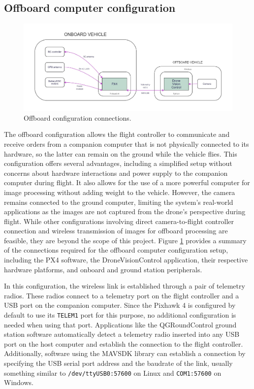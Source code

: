 \subsection{Offboard computer configuration}
\label{subsec:offboard}

\begin{figure}
  \centering
  \includegraphics[width=\textwidth,keepaspectratio]{img/offboard-diagram.jpg}
  \caption{Offboard configuration connections.}
  \label{fig:offboard-config}
\end{figure}

The offboard configuration allows the flight controller to communicate and receive orders from a companion computer that is not physically connected to its hardware, so the latter can remain on the ground while the vehicle flies.
This configuration offers several advantages, including a simplified setup without concerns about hardware interactions and power supply to the companion computer during flight. It also allows for the use of a more powerful computer for image processing without adding weight to the vehicle. However, the camera remains connected to the ground computer, limiting the system's real-world applications as the images are not captured from the drone's perspective during flight. While other configurations involving direct camera-to-flight controller connection and wireless transmission of images for offboard processing are feasible, they are beyond the scope of this project. Figure \ref{fig:offboard-config} provides a summary of the connections required for the offboard computer configuration setup, including the PX4 software, the DroneVisionControl application, their respective hardware platforms, and onboard and ground station peripherals.

In this configuration, the wireless link is established through a pair of telemetry radios.
These radios connect to a telemetry port on the flight controller and a USB port on the companion computer. 
Since the Pixhawk 4 is configured by default to use its \texttt{TELEM1} port for this purpose, no additional configuration is needed when using that port.
Applications like the QGRoundControl ground station software automatically detect a telemetry radio inserted into any USB port on the host computer and establish the connection to the flight controller.
Additionally, software using the MAVSDK library can establish a connection by specifying the USB serial port address and the baudrate of the link, usually something similar to \texttt{/dev/ttyUSB0:57600} on Linux and \texttt{COM1:57600} on Windows.

